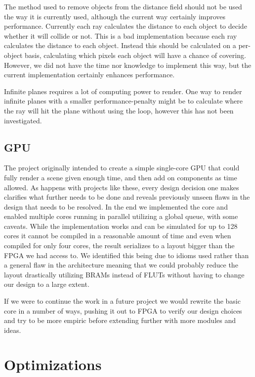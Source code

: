 			The method used to remove objects from the distance field should
			not be used the way it is currently used, although the current way
			certainly improves performance. Currently each ray calculates the
			distance to each object to decide whether it will collide or not. 
			This is a bad implementation because each ray calculates the 
			distance to each object. Instead this should be calculated on a 
			per-object basis, calculating which pixels each object will have
			a chance of covering. However, we did not have the time nor
			knowledge to implement this way, but the current implementation
			certainly enhances performance.

			Infinite planes requires a lot of computing power to render. One 
			way to render infinite planes with a smaller performance-penalty 
			might be to calculate where the ray will hit the plane without 
			using the loop, however this has not been investigated. 


		
		\subsection{GPU} 
		
			The project originally intended to create a simple single-core GPU
			that could fully render a scene given enough time, and then add on
			components as time allowed. As happens with projects like these,
			every design decision one makes clarifies what further needs to be
			done and reveals previously unseen flaws in the design that needs
			to be resolved. In the end we implemented the core and enabled
			multiple cores running in parallel utilizing a global queue, with
			some caveats. While the implementation works and can be simulated
			for up to 128 cores it cannot be compiled in a reasonable amount of
			time and even when compiled for only four cores, the result
			serializes to a layout bigger than the FPGA we had access to. We
			identified this being due to idioms used rather than a general flaw
			in the architecture meaning that we could probably reduce the
			layout drastically utilizing BRAMs instead of FLUTs without having
			to change our design to a large extent. 
			
			If we were to continue the work in a future project we would
			rewrite the basic core in a number of ways, pushing it out to FPGA
			to verify our design choices and try to be more empiric before
			extending further with more modules and ideas. 

	\section{Optimizations}

